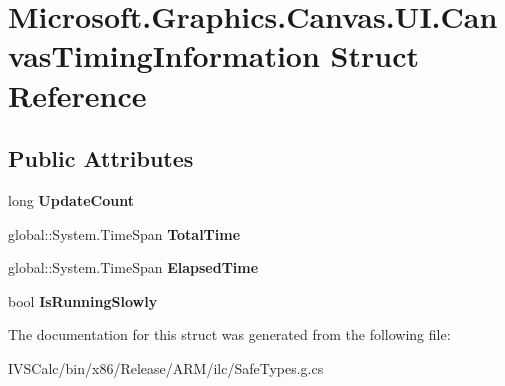 \hypertarget{struct_microsoft_1_1_graphics_1_1_canvas_1_1_u_i_1_1_canvas_timing_information}{}\section{Microsoft.\+Graphics.\+Canvas.\+U\+I.\+Canvas\+Timing\+Information Struct Reference}
\label{struct_microsoft_1_1_graphics_1_1_canvas_1_1_u_i_1_1_canvas_timing_information}
\subsection*{Public Attributes}
\begin{DoxyCompactItemize}
\item 
\mbox{\label{struct_microsoft_1_1_graphics_1_1_canvas_1_1_u_i_1_1_canvas_timing_information_a14981fb58f2abbdd471a5f081c422a9c}} 
long {\bfseries Update\+Count}
\item 
\mbox{\label{struct_microsoft_1_1_graphics_1_1_canvas_1_1_u_i_1_1_canvas_timing_information_ae092855957c70ce6b0e648b5ac6af0d0}} 
global\+::\+System.\+Time\+Span {\bfseries Total\+Time}
\item 
\mbox{\label{struct_microsoft_1_1_graphics_1_1_canvas_1_1_u_i_1_1_canvas_timing_information_a02c301004206dd7337dfc8e5acd83320}} 
global\+::\+System.\+Time\+Span {\bfseries Elapsed\+Time}
\item 
\mbox{\label{struct_microsoft_1_1_graphics_1_1_canvas_1_1_u_i_1_1_canvas_timing_information_aee8ee104b107ee5553ef743d623345d1}} 
bool {\bfseries Is\+Running\+Slowly}
\end{DoxyCompactItemize}


The documentation for this struct was generated from the following file\+:\begin{DoxyCompactItemize}
\item 
I\+V\+S\+Calc/bin/x86/\+Release/\+A\+R\+M/ilc/Safe\+Types.\+g.\+cs\end{DoxyCompactItemize}
